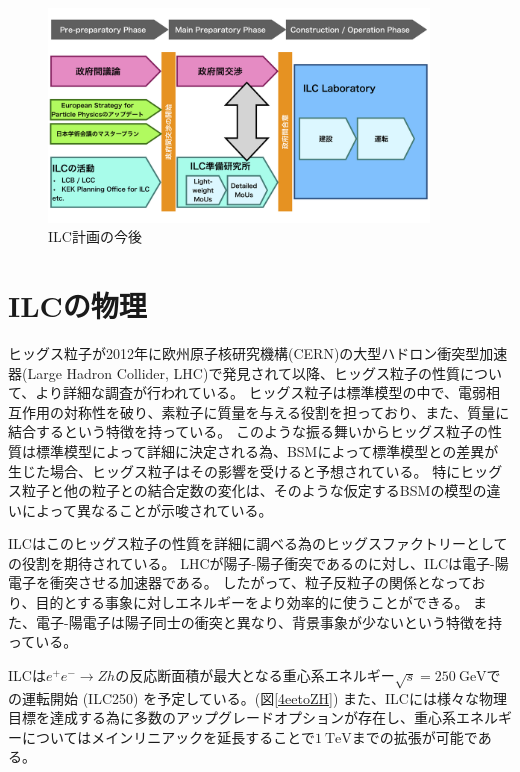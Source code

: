 \begin{figure}[h]
 \centering
 \includegraphics[width=0.9\textwidth]{Figure/1Introduction/3ILCProject.png}
 \caption{ILC計画の今後\cite{RecommendationsonILCProjectImplementation}}
 \label{3ILCProject}
\end{figure}

\section{ILCの物理} \label{Intro:PhysicsofILC}

ヒッグス粒子が2012年に欧州原子核研究機構(CERN)の大型ハドロン衝突型加速器(Large Hadron Collider, LHC)で発見されて以降、ヒッグス粒子の性質について、より詳細な調査が行われている。
ヒッグス粒子は標準模型の中で、電弱相互作用の対称性を破り、素粒子に質量を与える役割を担っており、また、質量に結合するという特徴を持っている。
このような振る舞いからヒッグス粒子の性質は標準模型によって詳細に決定される為、BSMによって標準模型との差異が生じた場合、ヒッグス粒子はその影響を受けると予想されている。
特にヒッグス粒子と他の粒子との結合定数の変化は、そのような仮定するBSMの模型の違いによって異なることが示唆されている。

ILCはこのヒッグス粒子の性質を詳細に調べる為のヒッグスファクトリーとしての役割を期待されている。
LHCが陽子-陽子衝突であるのに対し、ILCは電子-陽電子を衝突させる加速器である。
したがって、粒子反粒子の関係となっており、目的とする事象に対しエネルギーをより効率的に使うことができる。
また、電子-陽電子は陽子同士の衝突と異なり、背景事象が少ないという特徴を持っている。

ILCは$e^+e^- \to Zh$の反応断面積が最大となる重心系エネルギー$\sqrt{s}=250\ \mathrm{GeV}$での運転開始 (ILC250) を予定している。(図\ref{4eetoZH})
また、ILCには様々な物理目標を達成する為に多数のアップグレードオプションが存在し、重心系エネルギーについてはメインリニアックを延長することで$1\ \mathrm{TeV}$までの拡張が可能である。

